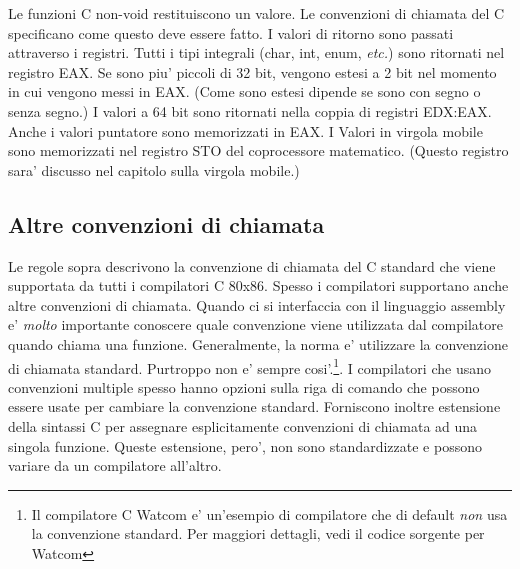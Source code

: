 Le funzioni C non-void restituiscono un valore. Le convenzioni di chiamata
del C specificano come questo deve essere fatto. I valori di ritorno
sono passati attraverso i registri. Tutti i tipi integrali ({\code char}, 
{\code int}, {\code enum}, \emph{etc.}) sono ritornati nel registro EAX.
Se sono piu' piccoli di 32 bit, vengono estesi a 2 bit nel momento in cui 
vengono messi in EAX. (Come sono estesi dipende se sono con segno o
senza segno.) I valori a 64 bit sono ritornati nella coppia di registri EDX:EAX. Anche i valori puntatore sono memorizzati
in EAX. I Valori in virgola mobile sono memorizzati nel registro STO del
coprocessore matematico. (Questo registro sara' discusso nel capitolo sulla
virgola mobile.)


\subsection{Altre convenzioni di chiamata}

Le regole sopra descrivono la convenzione di chiamata del C standard
che viene supportata da tutti i compilatori C 80x86. Spesso i compilatori
supportano anche altre convenzioni di chiamata. Quando ci si interfaccia
con il linguaggio assembly e' \emph{molto} importante conoscere quale
convenzione viene utilizzata dal compilatore quando chiama una 
funzione. Generalmente, la norma e' utilizzare la convenzione di 
chiamata standard. Purtroppo non e' sempre cosi'.\footnote{Il
compilatore C Watcom e' un'esempio di 
compilatore che di default \emph{non} usa la convenzione standard. Per
maggiori dettagli, vedi il codice sorgente per Watcom}. I compilatori
che usano convenzioni multiple spesso hanno opzioni sulla riga di comando
che possono essere usate per cambiare la convenzione standard. Forniscono
inoltre estensione della sintassi C per assegnare esplicitamente 
convenzioni di chiamata ad una singola funzione. Queste estensione, pero',
non sono standardizzate e possono variare da un compilatore all'altro.

